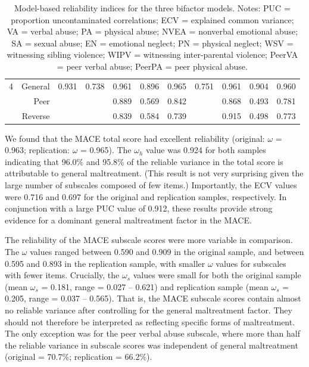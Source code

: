 \documentclass[letterpaper,man,natbib,floatsintext,longtable]{apa6}
\begin{document}
\begin{table}[t!]
\begin{tabular*}{\textwidth}{crccccccccc}
\midrule
4 & General &  0.931 & 0.738 &  0.961 &   0.896 &  0.965 & 0.751 & 0.961 & 0.904 & 0.960 \\
& Peer      &        &       &  0.889 &   0.569 &  0.842 &       & 0.868 & 0.493 & 0.781 \\
& Reverse   &        &       &  0.839 &   0.584 &  0.739 &       & 0.915 & 0.498 & 0.773 \\
\bottomrule
\end{tabular*}
\captionsetup{width=1.\textwidth}
\caption{\normalfont Model-based reliability indices for the three bifactor models. Notes: PUC = proportion uncontaminated correlations; ECV = explained common variance; VA = verbal abuse; PA = physical abuse; NVEA = nonverbal emotional abuse; SA = sexual abuse; EN = emotional neglect; PN = physical neglect; WSV = witnessing sibling violence; WIPV = witnessing inter-parental violence; PeerVA = peer verbal abuse; PeerPA = peer physical abuse.}
\label{table:reliability}
\end{table}

We found that the MACE total score had excellent reliability (original: $\omega$ = 0.963; replication: $\omega$ = 0.965). The $\omega_h$ value was 0.924 for both samples indicating that 96.0\% and 95.8\% of the reliable variance in the total score is attributable to general maltreatment. (This result is not very surprising given the large number of subscales composed of few items.) Importantly, the ECV values were 0.716 and 0.697 for the original and replication samples, respectively. In conjunction with a large PUC value of 0.912, these results provide strong evidence for a dominant general maltreatment factor in the MACE. 

The reliability of the MACE subscale scores were more variable in comparison. The $\omega$ values ranged between 0.590 and 0.909 in the original sample, and between 0.595 and 0.893 in the replication sample, with smaller $\omega$ values for subscales with fewer items. Crucially, the $\omega_s$ values were small for both the original sample (mean $\omega_s$ = 0.181, range = 0.027 -- 0.621) and replication sample (mean $\omega_s$ = 0.205, range = 0.037 -- 0.565). That is, the MACE subscale scores contain almost no reliable variance after controlling for the general maltreatment factor. They should not therefore be interpreted as reflecting specific forms of maltreatment. The only exception was for the peer verbal abuse subscale, where more than half the reliable variance in subscale scores was independent of general maltreatment (original = 70.7\%; replication = 66.2\%).
\end{document}
